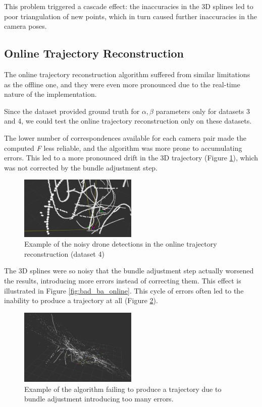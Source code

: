 \documentclass[11pt]{article}
\begin{document}
This problem triggered a cascade effect: the inaccuracies in the 3D splines led to poor triangulation of new points, which in turn caused further inaccuracies in the camera poses.

\subsection{Online Trajectory Reconstruction}

The online trajectory reconstruction algorithm suffered from similar limitations as the offline one, and they were even more pronounced due to the real-time nature of the implementation.

Since the dataset provided ground truth for $\alpha,\beta$ parameters only for datasets 3 and 4, we could test the online trajectory reconstruction only on these datasets.

The lower number of correspondences available for each camera pair made the computed \textit{F} less reliable, and the algorithm was more prone to accumulating errors. This led to a more pronounced drift in the 3D trajectory (Figure \ref{fig:online_noisy_detections}), which was not corrected by the bundle adjustment step.

\begin{figure}[h]
    \centering
    \includegraphics[width=0.5\textwidth]{imgs/online_noisy_detections.png}
    \caption{Example of the noisy drone detections in the online trajectory reconstruction (dataset 4)}
    \label{fig:online_noisy_detections}
\end{figure}

The 3D splines were so noisy that the bundle adjustment step actually worsened the results, introducing more errors instead of correcting them. This effect is illustrated in Figure \ref{fig:bad_ba_online}. This cycle of errors often led to the inability to produce a trajectory at all (Figure \ref{fig:bad_ba_online_failed}).

\begin{figure}[h]
    \centering
    \includegraphics[width=0.5\textwidth]{imgs/online_failed_due_to_ba.png}
    \caption{Example of the algorithm failing to produce a trajectory due to bundle adjustment introducing too many errors.}
    \label{fig:bad_ba_online_failed}
\end{figure}
\end{document}
